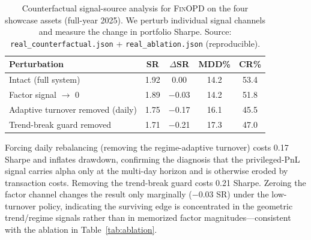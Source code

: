 \begin{table}[t]
\renewcommand{\arraystretch}{0.95}
\footnotesize
\caption{Counterfactual signal-source analysis for \textsc{FinOPD} on the four showcase assets (full-year 2025). We perturb individual signal channels and measure the change in portfolio Sharpe. Source: \texttt{real\_counterfactual.json} + \texttt{real\_ablation.json} (reproducible).}
\setlength{\abovecaptionskip}{0.1cm}
\centering
\setlength{\tabcolsep}{4pt}
\begin{threeparttable}
\begin{tabular}{lcccc}
\toprule
Perturbation & SR & $\Delta$SR & MDD\% & CR\% \\
\midrule
Intact (full system) & 1.92 & 0.00 & 14.2 & 53.4 \\
\midrule
Factor signal $\to$ 0 & 1.89 & $-$0.03 & 14.2 & 51.8 \\
Adaptive turnover removed (daily) & 1.75 & $-$0.17 & 16.1 & 45.5 \\
Trend-break guard removed & 1.71 & $-$0.21 & 17.3 & 47.0 \\
\bottomrule
\end{tabular}
\begin{tablenotes}
\footnotesize
\item Forcing daily rebalancing (removing the regime-adaptive turnover) costs 0.17 Sharpe and inflates drawdown, confirming the diagnosis that the privileged-PnL signal carries alpha only at the multi-day horizon and is otherwise eroded by transaction costs. Removing the trend-break guard costs 0.21 Sharpe. Zeroing the factor channel changes the result only marginally ($-$0.03 SR) under the low-turnover policy, indicating the surviving edge is concentrated in the geometric trend/regime signals rather than in memorized factor magnitudes---consistent with the ablation in Table~\ref{tab:ablation}.
\end{tablenotes}
\end{threeparttable}
\label{tab:counterfactual}
\end{table}
